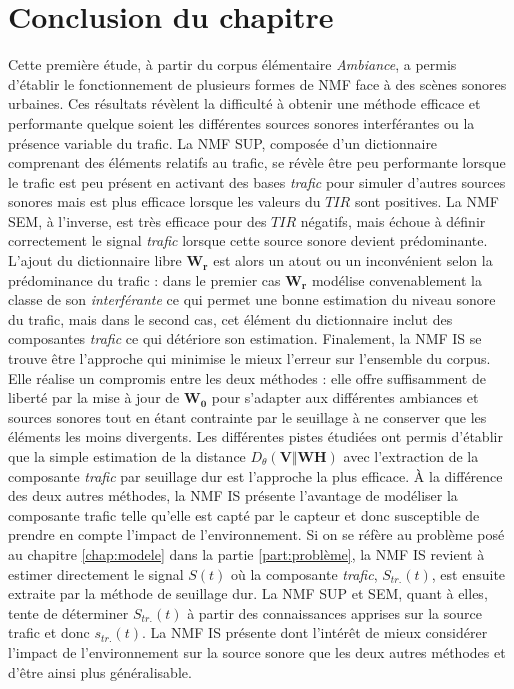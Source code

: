 \section{Conclusion du chapitre}
Cette première étude, à partir du corpus élémentaire \textit{Ambiance}, a permis d'établir le fonctionnement de plusieurs formes de NMF face à des scènes sonores urbaines. Ces résultats révèlent la difficulté à obtenir une méthode efficace et performante quelque soient les différentes sources sonores interférantes ou la présence variable du trafic.
La NMF SUP, composée d'un dictionnaire comprenant des éléments relatifs au trafic, se révèle être peu performante lorsque le trafic est peu présent en activant des bases \textit{trafic} pour simuler d'autres sources sonores mais est plus efficace lorsque les valeurs du $TIR$ sont positives. La NMF SEM, à l'inverse, est très efficace pour des $TIR$ négatifs, mais échoue à définir correctement le signal \textit{trafic} lorsque cette source sonore devient prédominante. L'ajout du dictionnaire libre $\mathbf{W_r}$ est alors un atout ou un inconvénient selon la prédominance du trafic : dans le premier cas $\mathbf{W_r}$ modélise convenablement la classe de son \textit{interférante} ce qui permet une bonne estimation du niveau sonore du trafic, mais dans le second cas, cet élément du dictionnaire inclut des composantes \textit{trafic} ce qui détériore son estimation. Finalement, la NMF IS se trouve être l'approche qui minimise le mieux l'erreur sur l'ensemble du corpus. Elle réalise un compromis entre les deux méthodes : elle offre suffisamment de liberté par la mise à jour de $\mathbf{W_0}$ pour s'adapter aux différentes ambiances et sources sonores tout en étant contrainte par le seuillage à ne conserver que les éléments les moins divergents. Les différentes pistes étudiées ont permis d'établir que la simple estimation de la distance $D_{\theta}(\mathbf{V}\Vert\mathbf{WH})$ avec l'extraction de la composante \textit{trafic} par seuillage dur est l'approche la plus efficace. \`A la différence des deux autres méthodes, la NMF IS présente l'avantage de modéliser la composante trafic telle qu'elle est capté par le capteur et donc susceptible de prendre en compte l'impact de l'environnement. Si on se réfère au problème posé au chapitre \ref{chap:modele} dans la partie \ref{part:problème}, la NMF IS revient à estimer directement le signal $S(t)$ où la composante \textit{trafic}, $S_{tr.}(t)$, est ensuite extraite par la méthode de seuillage dur. La NMF SUP et SEM, quant à elles, tente de déterminer $S_{tr.}(t)$ à partir des connaissances apprises sur la source trafic et donc $s_{tr.}(t)$. La NMF IS présente dont l'intérêt de mieux considérer l'impact de l'environnement sur la source sonore que les deux autres méthodes et d'être ainsi plus généralisable.\\





%
